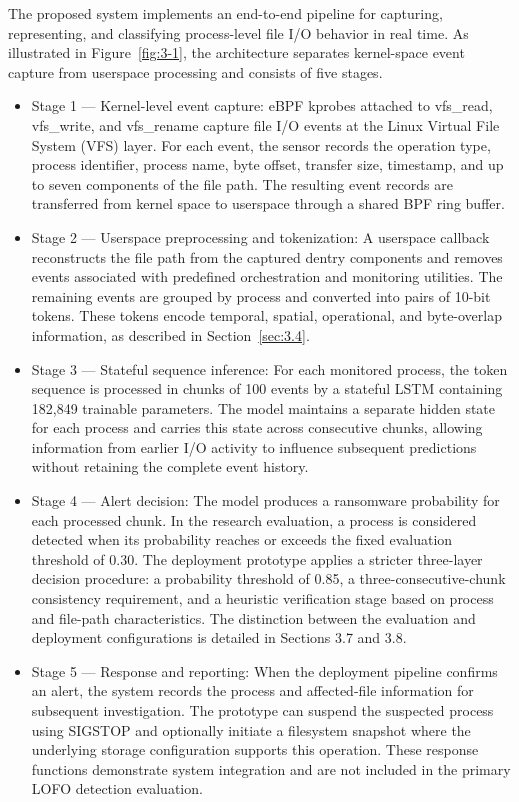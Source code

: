 The proposed system implements an end-to-end pipeline for capturing, representing, and classifying process-level file I/\allowbreak{}O behavior in real time. As illustrated in Figure~\ref{fig:3-1}, the architecture separates kernel-space event capture from userspace processing and consists of five stages.

\begin{itemize}
\item Stage 1 --- Kernel-level event capture: eBPF kprobes attached to vfs\_\allowbreak{}read, vfs\_\allowbreak{}write, and vfs\_\allowbreak{}rename capture file I/\allowbreak{}O events at the Linux Virtual File System (VFS) layer. For each event, the sensor records the operation type, process identifier, process name, byte offset, transfer size, timestamp, and up to seven components of the file path. The resulting event records are transferred from kernel space to userspace through a shared BPF ring buffer.
\item Stage 2 --- Userspace preprocessing and tokenization: A userspace callback reconstructs the file path from the captured dentry components and removes events associated with predefined orchestration and monitoring utilities. The remaining events are grouped by process and converted into pairs of 10-bit tokens. These tokens encode temporal, spatial, operational, and byte-overlap information, as described in Section~\ref{sec:3.4}.
\item Stage 3 --- Stateful sequence inference: For each monitored process, the token sequence is processed in chunks of 100 events by a stateful \textmu{}LSTM containing 182,849 trainable parameters. The model maintains a separate hidden state for each process and carries this state across consecutive chunks, allowing information from earlier I/\allowbreak{}O activity to influence subsequent predictions without retaining the complete event history.
\item Stage 4 --- Alert decision: The model produces a ransomware probability for each processed chunk. In the research evaluation, a process is considered detected when its probability reaches or exceeds the fixed evaluation threshold of 0.30. The deployment prototype applies a stricter three-layer decision procedure: a probability threshold of 0.85, a three-consecutive-chunk consistency requirement, and a heuristic verification stage based on process and file-path characteristics. The distinction between the evaluation and deployment configurations is detailed in Sections 3.7 and 3.8.
\item Stage 5 --- Response and reporting: When the deployment pipeline confirms an alert, the system records the process and affected-file information for subsequent investigation. The prototype can suspend the suspected process using SIGSTOP and optionally initiate a filesystem snapshot where the underlying storage configuration supports this operation. These response functions demonstrate system integration and are not included in the primary LOFO detection evaluation.
\end{itemize}

